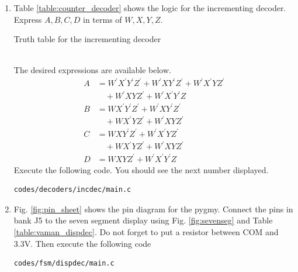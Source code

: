 \documentclass[journal,12pt,twocolumn]{IEEEtran}
\renewcommand\thesection{\arabic{section}}
\begin{document}
\begin{enumerate}[label=\thesection.\arabic*.,ref=\thesection.\theenumi]
\item Table \ref{table:counter_decoder} shows the logic for the incrementing decoder.  Express $A,B,C,D$ in terms of $W,X,Y,Z$.
\label{prob:counter_decoder}
\begin{table}
\centering

\caption{Truth table for the incrementing decoder}
\label{table:counter_decoder}
\end{table}
\\
\solution The desired expressions are available below. 
\begin{align}
\label{eq:inc_A}
A &= W^{\prime}X^{\prime}Y^{\prime}Z^{\prime} + W^{\prime}XY^{\prime}Z^{\prime}
+W^{\prime}X^{\prime}YZ^{\prime}
\nonumber \\
 & \quad +W^{\prime}XYZ^{\prime}
+W^{\prime}X^{\prime}Y^{\prime}Z
\\
\label{eq:inc_B}
B &= WX^{\prime}Y^{\prime}Z^{\prime} + W^{\prime}XY^{\prime}Z^{\prime}
\nonumber \\ 
& \quad 
+WX^{\prime}YZ^{\prime}
+W^{\prime}XYZ^{\prime}
\\
\label{eq:inc_C}
C &= WXY^{\prime}Z^{\prime} + W^{\prime}X^{\prime}YZ^{\prime}
\nonumber \\ 
& \quad 
+WX^{\prime}YZ^{\prime}
+W^{\prime}XYZ^{\prime}
\\
D &= WXYZ^{\prime} + W^{\prime}X^{\prime}Y^{\prime}Z
\label{eq:inc_D}
\end{align}
Execute the following code.  You should see the next number displayed.

\begin{lstlisting}
codes/decoders/incdec/main.c
\end{lstlisting}
%
%
\item Fig. \ref{fig:pin_sheet} shows the pin diagram for the pygmy.  Connect the pins in bank J5 to the seven segment display using
Fig. \ref{fig:sevenseg} and Table \ref{table:vaman_dispdec}.  Do not forget to put a resistor between COM and 3.3V.  Then execute the following code 
\begin{lstlisting}
codes/fsm/dispdec/main.c
\end{lstlisting}
%


\end{enumerate}
\end{document}
